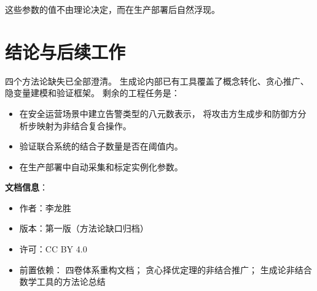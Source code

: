 \documentclass[11pt,a4paper]{article}
\begin{document}
这些参数的值不由理论决定，而在生产部署后自然浮现。

\section{结论与后续工作}

四个方法论缺失已全部澄清。
生成论内部已有工具覆盖了概念转化、贪心推广、隐变量建模和验证框架。
剩余的工程任务是：
\begin{itemize}
    \item 在安全运营场景中建立告警类型的八元数表示，
          将攻击方生成步和防御方分析步映射为非结合复合操作。
    \item 验证联合系统的结合子数量是否在阈值内。
    \item 在生产部署中自动采集和标定实例化参数。
\end{itemize}

\vspace{5mm}
\noindent\textbf{文档信息}：
\begin{itemize}
    \item 作者：李龙胜
    \item 版本：第一版（方法论缺口归档）
    \item 许可：CC BY 4.0
    \item 前置依赖：
          四卷体系重构文档；
          贪心择优定理的非结合推广；
          生成论非结合数学工具的方法论总结
\end{itemize}
\end{document}
